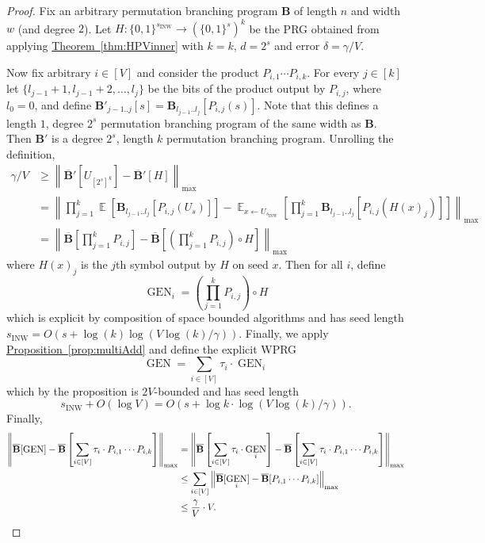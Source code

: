 \documentclass[11pt]{article}
\numberwithin{equation}{section}
\theoremstyle{definition}
\theoremstyle{plain}
\newcommand{\expref}[2]{\hyperref[#2]{#1~\ref{#2}}}
\newcommand{\zo}{\{0,1\}}
\newcommand{\la}{\leftarrow}
\newcommand{\ra}{\rightarrow}
\DeclareMathOperator*{\E}{\mathbb{E}}
\newcommand{\lbar}{\left\|}
\newcommand{\rbar}{\right\|}
\DeclareMathOperator{\gen}{GEN}
\newcommand{\bp}{{\mathbf{B}}}
\newcommand{\bbp}{\overline{\mathbf{B}}}
\newcommand{\sINW}{s_{\mathrm{INW}}}
\begin{document}
\begin{proof}
Fix an arbitrary permutation branching program $\bp$ of length $n$ and width $w$ (and degree $2$). Let $H:\zo^{\sINW}\ra (\zo^s)^k$ be the PRG obtained from applying \expref{Theorem}{thm:HPVinner} with $k=k$, $d=2^s$ and error $\delta=\gamma/V$.

Now fix arbitrary $i \in [V]$ and consider the product $P_{i,1}\cdots P_{i,k}$. For every $j\in[k]$ let $\{l_{j-1}+1,l_{j-1}+2,\ldots,l_j\}$ be the bits of the product output by $P_{i,j}$, where $l_{0}=0$, and define $\bp'_{j-1..j}[s]=\bp_{l_{j-1}..l_j}[P_{i,j}(s)]$. Note that this defines a length $1$, degree $2^s$ permutation branching program of the same width as $\bp$.
Then $\bp'$ is a degree $2^s$, length $k$ permutation branching program. Unrolling the definition,
\begin{align*}
    \gamma/V &\geq \lbar\bbp'[U_{[2^s]^k}]-\bbp'[H]\rbar_{\max}\\
    &= \lbar \prod_{j=1}^k\E[\bp_{l_{j-1}..l_j}[P_{i,j}(U_s)]] - \E_{x\la U_{\sINW}}\left[ \prod_{j=1}^k\bp_{l_{j-1}..l_j}[P_{i,j}(H(x)_j)]\right]\rbar_{\max}\\
    &= \lbar\bbp\left[\prod_{j=1}^k P_{i,j}\right] - \bbp\left[\left(\prod_{j=1}^k P_{i,j}\right)\circ H\right]\rbar_{\max}
\end{align*}
where $H(x)_j$ is the $j$th symbol output by $H$ on seed $x$. Then for all $i$, define 
\[\gen_i=\left(\prod_{j=1}^k P_{i,j}\right)\circ H\]
which is explicit by composition of space bounded algorithms and has seed length $\sINW=O(s+\log(k)\log(V\log(k)/\gamma))$.
Finally, we apply \expref{Proposition}{prop:multiAdd} and define the explicit WPRG
$$\gen=\sum_{i\in [V]} \tau_i \cdot \gen_i$$
which by the proposition is $2V$-bounded and has seed length \[\sINW+O(\log V)=O(s+\log k\cdot\log(V\log(k)/\gamma)).\]
Finally, 
\begin{align*}
    \lbar \bbp[\gen]-\bbp\left[\sum_{i\in[V]}\tau_i\cdot P_{i,1}\cdots P_{i,k}\right]\rbar_{\max} &=
    \lbar \bbp\left[\sum_{i\in[V]}\tau_i \cdot\gen_i\right]-\bbp\left[\sum_{i\in[V]}\tau_i\cdot P_{i,1}\cdots P_{i,k}\right]\rbar_{\max}\\ 
    &\leq \sum_{i\in [V]}\lbar \bbp[\gen_i] - \bbp[P_{i,1}\cdots P_{i,k}]\rbar_{\max}\\
    &\leq \frac{\gamma}{V}\cdot V. \qedhere 
\end{align*}
\end{proof}
\end{document}
